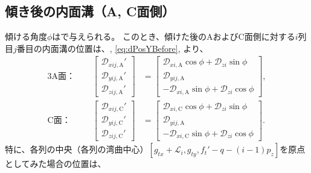 



\subsection{傾き後の内面溝（A, C面側）}
傾ける角度$\phi$はで与えられる。
このとき、傾けた後のAおよびC面側に対する$i$列目$j$番目の内面溝の位置は、, \eqref{eq:dPosYBefore}, より、
\begin{alignat*}{3}
  \text{A面：}&~~&
  \left[
  \begin{array}{c}
    \mathcal D_{xij,\mathrm A}'\\
    \mathcal D_{yij,\mathrm A}'\\
    \mathcal D_{zij,\mathrm A}'
  \end{array}
  \right]
 &= \left[
    \begin{array}{c}
      \mathcal D_{xi,\mathrm A}\cos\phi+\mathcal D_{zi}\sin\phi\\
      \mathcal D_{yij,\mathrm A}\\
      -\mathcal D_{xi,\mathrm A}\sin\phi+\mathcal D_{zi}\cos\phi
    \end{array}
    \right],\\[2pt]
  \text{C面：}&~~&
  \left[
  \begin{array}{c}
    \mathcal D_{xij,\mathrm C}'\\
    \mathcal D_{yij,\mathrm C}'\\
    \mathcal D_{zij,\mathrm C}'
  \end{array}
  \right]
 &= \left[
    \begin{array}{c}
      \mathcal D_{xi,\mathrm C}\cos\phi+\mathcal D_{zi}\sin\phi\\
      \mathcal D_{yij,\mathrm A}\\
      -\mathcal D_{xi,\mathrm C}\sin\phi+\mathcal D_{zi}\cos\phi
    \end{array}
    \right].
\end{alignat*}
特に、各列の中央（各列の湾曲中心）$[g_{tx}+\mathcal L_i, g_{ty}, f_t'-q-(i-1)p_z]$を原点としてみた場合の位置は、

